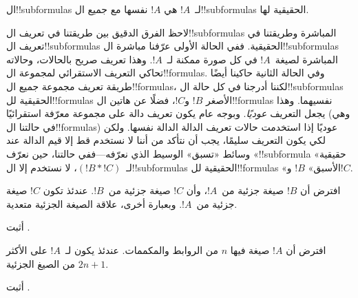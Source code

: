\documentclass[../../../include/open-logic-section]{subfiles}
\begin{document}
\begin{defn}[!!^{subformula}]
ال!!{subformula}s لـ~$!A$ هي $!A$ نفسها مع جميع ال!!{subformula}s
الحقيقية لها.
\end{defn}

\begin{explain}
لاحظ الفرق الدقيق بين طريقتنا في تعريف ال!!{subformula}s المباشرة
وطريقتنا في تعريف ال!!{subformula}s الحقيقية. ففي الحالة الأولى
عرّفنا مباشرة ال!!{subformula}s المباشرة لصيغة~$!A$ في كل صورة ممكنة
لـ~$!A$. وهذا تعريف صريح بالحالات، وحالاته تحاكي التعريف الاستقرائي
لمجموعة ال!!{formula}s. وفي الحالة الثانية حاكينا أيضًا طريقة تعريف
مجموعة جميع ال!!{formula}s، لكننا أدرجنا في كل حالة ال!!{subformula}s
الحقيقية لل!!{formula}s الأصغر $!B$ و$!C$، فضلًا عن هاتين
ال!!{formula}s نفسيهما. وهذا يجعل التعريف \emph{عوديًا}. وبوجه عام
يكون تعريف دالة على مجموعة معرّفة استقرائيًا (وهي في حالتنا
ال!!{formula}s) عوديًا إذا استخدمت حالات تعريف الدالة الدالة نفسها.
ولكن لكي يكون التعريف سليمًا، يجب أن نتأكد من أننا لا نستخدم قط إلا
قيم الدالة عند وسائط «تسبق» الوسيط الذي نعرّفه---ففي حالتنا، حين
نعرّف «!!{subformula} حقيقية» لـ~$(!B \ast !C)$، لا نستخدم إلا
ال!!{subformula}s الحقيقية لل!!{formula}s «الأسبق» $!B$ و$!C$.
\end{explain}

\begin{prop}
افترض أن $!B$ صيغة جزئية من~$!A$، وأن $!C$ صيغة جزئية من~$!B$.
عندئذ تكون $!C$ صيغة جزئية من~$!A$. وبعبارة أخرى، علاقة الصيغة
الجزئية متعدية.
\end{prop}

\begin{prob}
أثبت .
\end{prob}

\begin{prop}
افترض أن $!A$ صيغة فيها $n$ من الروابط والمكممات. عندئذ يكون لـ~$!A$
على الأكثر $2n+1$ من الصيغ الجزئية.
\end{prop}

\begin{prob}
أثبت .
\end{prob}
\end{document}
